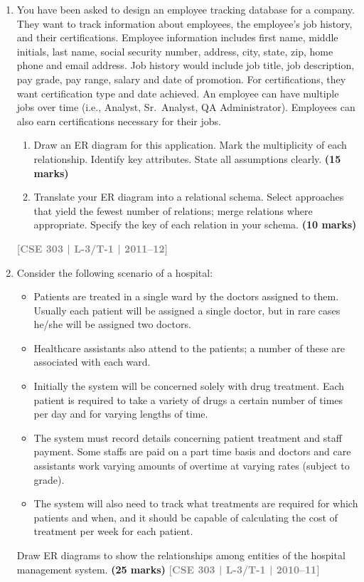 \documentclass[12pt]{article}
\newcommand{\yr}[1]{\hfill\textcolor{gray}{\small\textbf{[#1]}}}
\newcommand{\mk}[1]{\textcolor{orange!70!black}{\small\textbf{(#1 marks)}}}
\begin{document}
\begin{enumerate}
Draw an Entity-Relationship (ER) diagram to represent the Library data requirements described above.
\mk{18} \yr{CSE 303 | L-3/T-1 | 2013--14}


\item You have been asked to design an employee tracking database for a company. They want to track information about employees, the employee's job history, and their certifications. Employee information includes first name, middle initials, last name, social security number, address, city, state, zip, home phone and email address. Job history would include job title, job description, pay grade, pay range, salary and date of promotion. For certifications, they want certification type and date achieved. An employee can have multiple jobs over time (i.e., Analyst, Sr.\ Analyst, QA Administrator). Employees can also earn certifications necessary for their jobs.
\begin{enumerate}
   
\item Draw an ER diagram for this application. Mark the multiplicity of each relationship. Identify key attributes. State all assumptions clearly.
\mk{15}
\item Translate your ER diagram into a relational schema. Select approaches that yield the fewest number of relations; merge relations where appropriate. Specify the key of each relation in your schema.
\mk{10}
\end{enumerate}
\yr{CSE 303 | L-3/T-1 | 2011--12}




\item Consider the following scenario of a hospital:

\begin{itemize}[leftmargin=1.5em,itemsep=2pt]
  \item Patients are treated in a single ward by the doctors assigned to them. Usually each patient will be assigned a single doctor, but in rare cases he/she will be assigned two doctors.
  \item Healthcare assistants also attend to the patients; a number of these are associated with each ward.
  \item Initially the system will be concerned solely with drug treatment. Each patient is required to take a variety of drugs a certain number of times per day and for varying lengths of time.
  \item The system must record details concerning patient treatment and staff payment. Some staffs are paid on a part time basis and doctors and care assistants work varying amounts of overtime at varying rates (subject to grade).
  \item The system will also need to track what treatments are required for which patients and when, and it should be capable of calculating the cost of treatment per week for each patient.
\end{itemize}

Draw ER diagrams to show the relationships among entities of the hospital management system.
\mk{25} \yr{CSE 303 | L-3/T-1 | 2010--11}


\end{enumerate}
\end{document}
